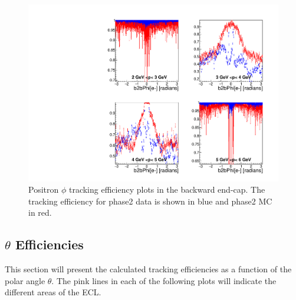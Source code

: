 \documentclass[a4paper,11pt,twosided,final,german,openbib,pdftex,listof=totoc,bibliography=totoc]{scrbook}
\begin{document}
\begin{figure}[!htbp]
	\centering
	\includegraphics[width=\textwidth]{Plots/master/xPMPhiepEC}
	\caption[Momentum $\phi$ Positron Backward End-Cap Efficiency Phase2]{Positron $\phi$ tracking efficiency plots in the backward end-cap. The tracking efficiency for phase2 data is shown in blue and phase2 MC in red.}
	
	\label{plt:xPMPhiepEC}
\end{figure}



\clearpage


\subsection{$\theta$ Efficiencies}

This section will present the calculated tracking efficiencies as a function of the polar angle $\theta$. The pink lines in each of the following plots will indicate the different areas of the ECL.
\end{document}
